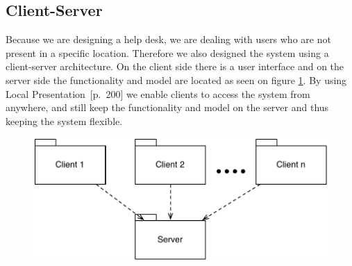 \subsection{Client-Server}
Because we are designing a help desk, we are dealing with users who are not present in a specific location. Therefore we also designed the system using a client-server architecture.
On the client side there is a user interface and on the server side the functionality and model are located as seen on figure \ref{fig:client-server}. By using Local Presentation~\cite{roedeaalborg}[p.~200] we enable clients to access the system from anywhere, and still keep the functionality and model on the server and thus keeping the system flexible.         


\begin{figure}%
\centering
	\includegraphics[scale=0.5]{input/architectural_design/client-server-architecture-pattern.pdf}%
	\morscaption{}
	\label{fig:client-server}%
\end{figure}